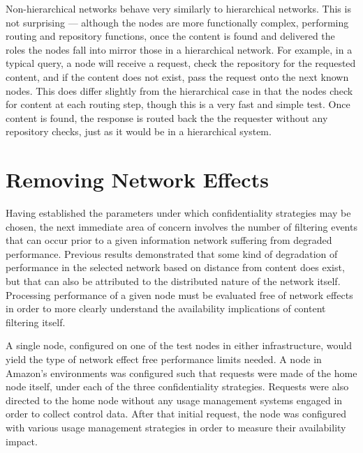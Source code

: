 Non-hierarchical networks behave very similarly to hierarchical networks.  This is not surprising --- although the nodes are more functionally complex, performing routing and repository functions, once the content is found and delivered the roles the nodes fall into mirror those in a hierarchical network.  For example, in a typical query, a node will receive a request, check the repository for the requested content, and if the content does not exist, pass the request onto the next known nodes.  This does differ slightly from the hierarchical case in that the nodes check for content at each routing step, though this is a very fast and simple test.  Once content is found, the response is routed back the the requester without any repository checks, just as it would be in a hierarchical system.

\section{Removing Network Effects}
Having established the parameters under which confidentiality strategies may be chosen, the next immediate area of concern involves the number of filtering events that can occur prior to a given information network suffering from degraded performance.  Previous results demonstrated that some kind of degradation of performance in the selected network based on distance from content does exist, but that can also be attributed to the distributed nature of the network itself.  Processing performance of a given node must be evaluated free of network effects in order to more clearly understand the availability implications of content filtering itself.

A single node, configured on one of the test nodes in either infrastructure, would yield the type of network effect free performance limits needed.  A node in Amazon's environments was configured such that requests were made of the home node itself, under each of the three confidentiality strategies.  Requests were also directed to the home node without any usage management systems engaged in order to collect control data.  After that initial request, the node was configured with various usage management strategies in order to measure their availability impact.


